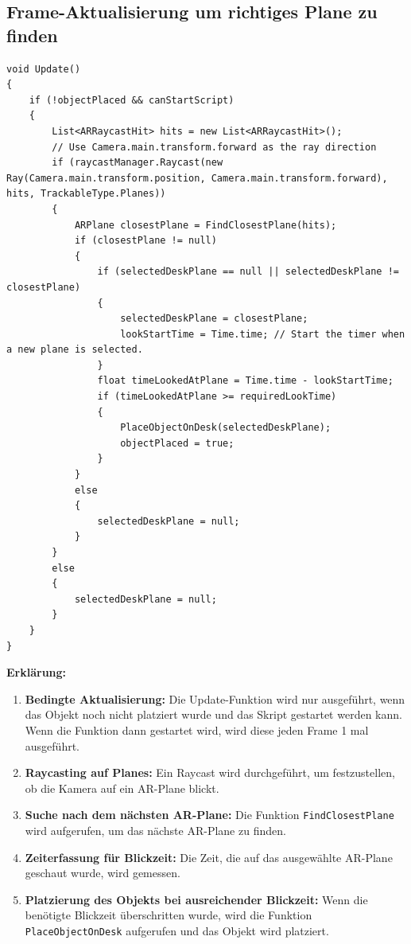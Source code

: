 \subsection*{Frame-Aktualisierung um richtiges Plane zu finden}
\begin{lstlisting}[style=csharp, caption={}, label=code:update]
void Update()
{
    if (!objectPlaced && canStartScript)
    {
        List<ARRaycastHit> hits = new List<ARRaycastHit>();
        // Use Camera.main.transform.forward as the ray direction
        if (raycastManager.Raycast(new Ray(Camera.main.transform.position, Camera.main.transform.forward), hits, TrackableType.Planes))
        {
            ARPlane closestPlane = FindClosestPlane(hits);
            if (closestPlane != null)
            {
                if (selectedDeskPlane == null || selectedDeskPlane != closestPlane)
                {
                    selectedDeskPlane = closestPlane;
                    lookStartTime = Time.time; // Start the timer when a new plane is selected.
                }
                float timeLookedAtPlane = Time.time - lookStartTime;
                if (timeLookedAtPlane >= requiredLookTime)
                {
                    PlaceObjectOnDesk(selectedDeskPlane);
                    objectPlaced = true;
                }
            }
            else
            {
                selectedDeskPlane = null;
            }
        }
        else
        {
            selectedDeskPlane = null;
        }
    }
}
\end{lstlisting}
\textbf{Erklärung:}
\begin{enumerate}
    \item \textbf{Bedingte Aktualisierung:} Die Update-Funktion wird nur ausgeführt, wenn das Objekt noch nicht platziert
    wurde und das Skript gestartet werden kann. Wenn die Funktion dann gestartet wird, wird diese jeden Frame 1 mal ausgeführt.
    \item \textbf{Raycasting auf Planes:} Ein Raycast wird durchgeführt, um festzustellen, ob die Kamera auf ein AR-Plane blickt.
    \item \textbf{Suche nach dem nächsten AR-Plane:} Die Funktion \texttt{FindClosestPlane} wird aufgerufen, um das
    nächste AR-Plane zu finden.
    \item \textbf{Zeiterfassung für Blickzeit:} Die Zeit, die auf das ausgewählte AR-Plane geschaut wurde, wird gemessen.
    \item \textbf{Platzierung des Objekts bei ausreichender Blickzeit:} Wenn die benötigte Blickzeit überschritten
    wurde, wird die Funktion \texttt{PlaceObjectOnDesk} aufgerufen und das Objekt wird platziert.\\
\end{enumerate}

